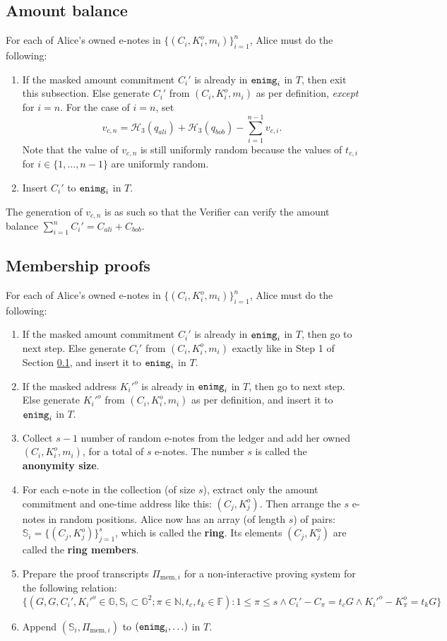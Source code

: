 \documentclass{article}
\begin{document}
\subsection{Amount balance}\label{amt-bal}
For each of Alice's owned e-notes in $\{(C_i,K_i^o,m_i)\}_{i=1}^n$, Alice must do the following:
\begin{enumerate}
    \item If the masked amount commitment $C_i'$ is already in ${\tt enimg}_i$ in $T$, then exit this subsection. Else generate $C_i'$ from $(C_i, K_i^o, m_i)$ as per definition, \textit{except} for $i=n$. For the case of $i=n$, set
    $$v_{c,n} = \mathcal{H}_3(q_{ali}) + \mathcal{H}_3(q_{bob}) - \sum_{i=1}^{n-1}{v_{c,i}}.$$
    Note that the value of $v_{c,n}$ is still uniformly random because the values of $t_{c,i}$ for $i\in\{1,\ldots,n-1\}$ are uniformly random.
    \item Insert $C_i'$ to ${\tt enimg}_i$ in $T$.
\end{enumerate}
The generation of $v_{c,n}$ is as such so that the Verifier can verify the amount balance $\sum_{i=1}^n{C_i'}=C_{ali}+C_{bob}$.

\subsection{Membership proofs}
For each of Alice's owned e-notes in $\{(C_i,K_i^o,m_i)\}_{i=1}^n$, Alice must do the following:
\begin{enumerate}
    \item If the masked amount commitment $C_i'$ is already in ${\tt enimg}_i$ in $T$, then go to next step. Else generate $C_i'$ from $(C_i, K_i^o, m_i)$ exactly like in Step 1 of Section \ref{amt-bal}, and insert it to ${\tt enimg}_i$ in $T$.
    \item If the masked address $K_i'^o$ is already in ${\tt enimg}_i$ in $T$, then go to next step. Else generate $K_i'^o$ from $(C_i, K_i^o, m_i)$ as per definition, and insert it to ${\tt enimg}_i$ in $T$.
    \item Collect $s-1$ number of random e-notes from the ledger and add her owned $(C_i,K_i^o,m_i)$, for a total of $s$ e-notes. The number $s$ is called the \textbf{anonymity size}.
    \item For each e-note in the collection (of size $s$), extract only the amount commitment and one-time address like this: $(C_j, K_j^o)$. Then arrange the $s$ e-notes in random positions. Alice now has an array (of length $s$) of pairs: $\mathbb{S}_i = \{(C_j, K_j^o)\}_{j=1}^s$, which is called the \textbf{ring}. Its elements $(C_j, K_j^o)$ are called the \textbf{ring members}. 
    \item Prepare the proof transcripts $\Pi_{\text{mem}, i}$ for a non-interactive proving system for the following relation:
$$\{(G, G, C_i', K_i'^o \in\mathbb{G}, \mathbb{S}_i\subset\mathbb{G}^2; \pi\in\mathbb{N}, t_c, t_k\in\mathbb{F}): 1\le\pi\le s \wedge C_i' - C_\pi = t_c G \wedge K_i'^o - K_\pi^o = t_k G \}$$
    \item Append $(\mathbb{S}_i, \Pi_{\text{mem}, i})$ to $({\tt enimg}_i, \ldots)$ in $T$.
\end{enumerate}
\end{document}
